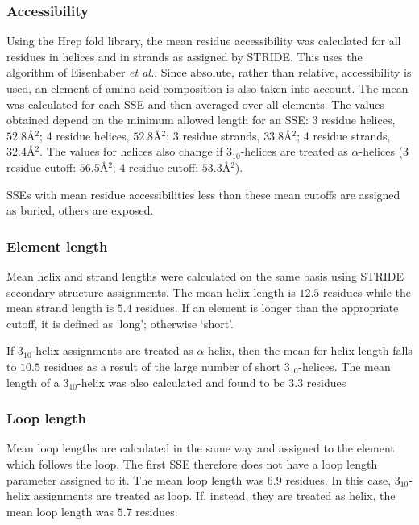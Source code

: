 \documentclass{article}
\newcommand{\htt}{\mbox{$3_{10}$}}
\newcommand{\Asq}{\mbox{\AA${}^{2}$}}
\begin{document}
\subsubsection{Accessibility}
Using the Hrep fold library, the mean residue accessibility was
calculated for all residues in helices and in strands as assigned by
STRIDE. This uses the algorithm of Eisenhaber \emph{et
al.}\cite{eisenhaber:nsc1,eisenhaber:nsc2}. Since absolute, rather
than relative, accessibility is used, an element of amino acid
composition is also taken into account. The mean was calculated for
each SSE and then averaged over all elements.  The values obtained
depend on the minimum allowed length for an SSE: 3 residue helices,
$52.8$\Asq; 4 residue helices, $52.8$\Asq; 3 residue strands,
$33.8$\Asq; 4 residue strands, $32.4$\Asq.  The values for helices
also change if \htt-helices are treated as $\alpha$-helices (3 residue
cutoff: $56.5$\Asq; 4 residue cutoff: $53.3$\Asq).

SSEs with mean residue accessibilities less
than these mean cutoffs are assigned as buried, others are exposed.

\subsubsection{Element length}
Mean helix and strand lengths were calculated on the same basis using
STRIDE secondary structure assignments. The
mean helix length is $12.5$ residues while the mean strand length is $5.4$
residues. If an element is longer than the appropriate cutoff, it is
defined as `long'; otherwise `short'.

If \htt-helix assignments are treated as $\alpha$-helix, then the mean
for helix length falls to $10.5$ residues as a result of the large number
of short \htt-helices. The mean length of a \htt-helix was also
calculated and found to be $3.3$ residues

\subsubsection{Loop length}
Mean loop lengths are calculated in the same way and assigned to the
element which follows the loop. The first SSE therefore does not have
a loop length parameter assigned to it. The mean loop length was $6.9$
residues. In this case, \htt-helix assignments are treated as
loop. If, instead, they are treated as helix, the mean loop length was
$5.7$ residues.
\end{document}
